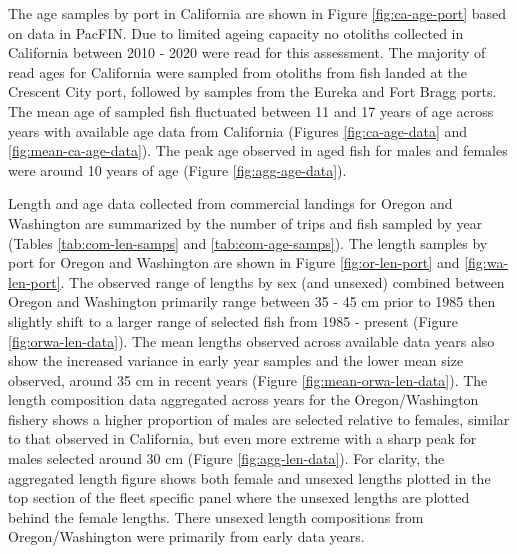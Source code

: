\documentclass[11pt,
  english,
  a4paper,
]{article}
\begin{document}
\leavevmode\tagmcend\tagstructend\par


The age samples by port in California are shown in Figure \ref{fig:ca-age-port} based on data in PacFIN. Due to limited ageing capacity no otoliths collected in California between 2010 - 2020 were read for this assessment. The majority of read ages for California were sampled from otoliths from fish landed at the Crescent City port, followed by samples from the Eureka and Fort Bragg ports. The mean age of sampled fish fluctuated between 11 and 17 years of age across years with available age data from California (Figures \ref{fig:ca-age-data} and \ref{fig:mean-ca-age-data}). The peak age observed in aged fish for males and females were around 10 years of age (Figure \ref{fig:agg-age-data}).

\leavevmode\tagmcend\tagstructend\par


Length and age data collected from commercial landings for Oregon and Washington are summarized by the number of trips and fish sampled by year (Tables \ref{tab:com-len-samps} and \ref{tab:com-age-samps}). The length samples by port for Oregon and Washington are shown in Figure \ref{fig:or-len-port} and \ref{fig:wa-len-port}. The observed range of lengths by sex (and unsexed) combined between Oregon and Washington primarily range between 35 - 45 cm prior to 1985 then slightly shift to a larger range of selected fish from 1985 - present (Figure \ref{fig:orwa-len-data}). The mean lengths observed across available data years also show the increased variance in early year samples and the lower mean size observed, around 35 cm in recent years (Figure \ref{fig:mean-orwa-len-data}). The length composition data aggregated across years for the Oregon/Washington fishery shows a higher proportion of males are selected relative to females, similar to that observed in California, but even more extreme with a sharp peak for males selected around 30 cm (Figure \ref{fig:agg-len-data}). For clarity, the aggregated length figure shows both female and unsexed lengths plotted in the top section of the fleet specific panel where the unsexed lengths are plotted behind the female lengths. There unsexed length compositions from Oregon/Washington were primarily from early data years.

\leavevmode\tagmcend\tagstructend\par
\end{document}
